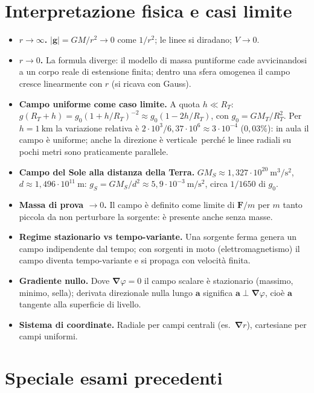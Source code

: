 \documentclass[11pt,a4paper]{article}
\newcommand{\vv}[1]{\mathbf{#1}}
\newcommand{\mo}[1]{\left|#1\right|}
\newcommand{\unit}[1]{\ \mathrm{#1}}
\newcommand{\nab}{\boldsymbol{\nabla}}
\begin{document}
\section{Interpretazione fisica e casi limite}
\begin{itemize}
\item \textbf{$r\to\infty$.} $\mo{\vv g}=GM/r^2\to0$ come $1/r^2$; le linee si diradano; $V\to0$.
\item \textbf{$r\to0$.} La formula diverge: il modello di massa puntiforme cade avvicinandosi a un corpo reale di estensione finita; dentro una sfera omogenea il campo cresce linearmente con $r$ (si ricava con Gauss).
\item \textbf{Campo uniforme come caso limite.} A quota $h\ll R_T$: $g(R_T+h)=g_0(1+h/R_T)^{-2}\approx g_0(1-2h/R_T)$, con $g_0=GM_T/R_T^2$. Per $h=1\unit{km}$ la variazione relativa è $2\cdot10^3/6{,}37\cdot10^6\approx3\cdot10^{-4}$ ($0{,}03\%$): in aula il campo è uniforme; anche la direzione è \guillemotleft verticale\guillemotright\ perché le linee radiali su pochi metri sono praticamente parallele.
\item \textbf{Campo del Sole alla distanza della Terra.} $GM_S\approx1{,}327\cdot10^{20}\unit{m^3/s^2}$, $d\approx1{,}496\cdot10^{11}\unit m$: $g_S=GM_S/d^2\approx5{,}9\cdot10^{-3}\unit{m/s^2}$, circa $1/1650$ di $g_0$.
\item \textbf{Massa di prova $\to0$.} Il campo è definito come limite di $\vv F/m$ per $m$ tanto piccola da non perturbare la sorgente: è presente anche senza masse.
\item \textbf{Regime stazionario vs tempo-variante.} Una sorgente ferma genera un campo indipendente dal tempo; con sorgenti in moto (elettromagnetismo) il campo diventa tempo-variante e si propaga con velocità finita.
\item \textbf{Gradiente nullo.} Dove $\nab\varphi=0$ il campo scalare è stazionario (massimo, minimo, sella); derivata direzionale nulla lungo $\vv a$ significa $\vv a\perp\nab\varphi$, cioè $\vv a$ tangente alla superficie di livello.
\item \textbf{Sistema di coordinate.} Radiale per campi centrali (es.\ $\nab r$), cartesiane per campi uniformi.
\end{itemize}

\section{Speciale esami precedenti}
\end{document}
